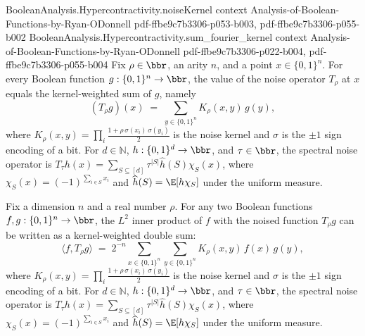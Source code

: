 \begin{lemma}
\proofstep
  {BooleanAnalysis.Hypercontractivity.noiseKernel}
  {context}
  {Analysis-of-Boolean-Functions-by-Ryan-ODonnell}
  {pdf-ffbe9c7b3306-p053-b003,
    pdf-ffbe9c7b3306-p055-b002}
\proofstep
  {BooleanAnalysis.Hypercontractivity.sum_fourier_kernel}
  {context}
  {Analysis-of-Boolean-Functions-by-Ryan-ODonnell}
  {pdf-ffbe9c7b3306-p022-b004,
    pdf-ffbe9c7b3306-p055-b004}
\label{BooleanAnalysis.Hypercontractivity.noiseOp_eq_kernel_sum}
Fix $\rho \in \bbr$, an arity $n$, and a point $x \in \{0,1\}^n$. For every Boolean
function $g : \{0,1\}^n \to \bbr$, the value of the noise operator $T_\rho$ at $x$
equals the kernel-weighted sum of $g$, namely
\[
  (T_\rho g)(x) \;=\; \sum_{y \in \{0,1\}^n} K_\rho(x,y)\, g(y),
\]
where $K_\rho(x,y) = \prod_{i} \tfrac{1 + \rho\,\sigma(x_i)\,\sigma(y_i)}{2}$ is the
noise kernel and $\sigma$ is the $\pm 1$ sign encoding of a bit. For $d\in\mathbb N$,
$h:\{0,1\}^d\to\bbr$, and $\tau\in\bbr$, the spectral noise operator is $T_\tau
h(x)=\sum_{S\subseteq[d]}\tau^{|S|}\widehat h(S)\chi_S(x)$, where
$\chi_S(x)=(-1)^{\sum_{i\in S}x_i}$ and $\widehat h(S)=\E[h\chi_S]$ under the uniform
measure.
\end{lemma}

\begin{lemma}
\leanok
{}
\label{BooleanAnalysis.Hypercontractivity.innerProduct_noiseOp_eq_weighted_sum}
Fix a dimension $n$ and a real number $\rho$. For any two Boolean functions $f, g :
\{0,1\}^n \to \bbr$, the $L^2$ inner product of $f$ with the noised function $T_\rho g$
can be written as a kernel-weighted double sum:
\[
\langle f, T_\rho g\rangle \;=\; 2^{-n} \sum_{x \in \{0,1\}^n} \sum_{y \in \{0,1\}^n}
K_\rho(x,y)\, f(x)\, g(y),
\]
where $K_\rho(x,y) = \prod_{i} \tfrac{1 + \rho\,\sigma(x_i)\,\sigma(y_i)}{2}$ is the
noise kernel and $\sigma$ is the $\pm 1$ sign encoding of a bit. For $d\in\mathbb N$,
$h:\{0,1\}^d\to\bbr$, and $\tau\in\bbr$, the spectral noise operator is $T_\tau
h(x)=\sum_{S\subseteq[d]}\tau^{|S|}\widehat h(S)\chi_S(x)$, where
$\chi_S(x)=(-1)^{\sum_{i\in S}x_i}$ and $\widehat h(S)=\E[h\chi_S]$ under the uniform
measure.
\end{lemma}

